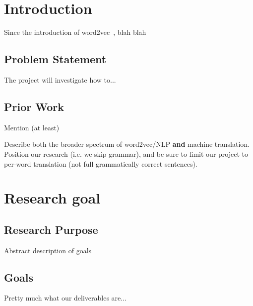 \section{Introduction}
Since the introduction of word2vec~\cite{mikolov2013efficient, mikolov2013distributed}, blah blah

\subsection{Problem Statement}
The project will investigate how to...

\subsection{Prior Work}
Mention (at least)~\cite{levy2014linguistic, mikolov2013exploiting, wolf2014joint}

Describe both the broader spectrum of word2vec/NLP \textbf{and} machine translation. Position our research (i.e. we skip grammar), and be sure to limit our project to per-word translation (not full grammatically correct sentences).

\lipsum[66]

\section{Research goal}
\lipsum[66]

\subsection{Research Purpose}
Abstract description of goals

\lipsum[66]

\subsection{Goals}
Pretty much what our deliverables are...

